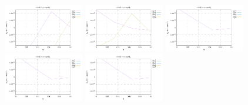 \noindent
\includegraphics[width=3.5cm]{python_codes/fieldstone_152/RESULTS/exp1/err_16_m2}
\includegraphics[width=3.5cm]{python_codes/fieldstone_152/RESULTS/exp1/err_16_m3}
\includegraphics[width=3.5cm]{python_codes/fieldstone_152/RESULTS/exp1/err_16_m4}
\includegraphics[width=3.5cm]{python_codes/fieldstone_152/RESULTS/exp1/err_16_m5}
\includegraphics[width=3.5cm]{python_codes/fieldstone_152/RESULTS/exp1/err_16_m6}

